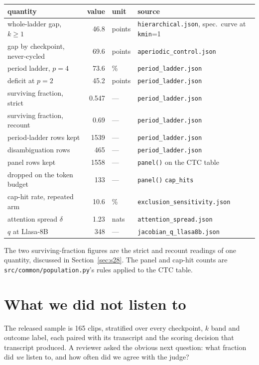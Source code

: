 \documentclass[11pt]{article}
\begin{document}
\begin{center}
{\footnotesize
\begin{tabular}{@{}lrll@{}}
\toprule
quantity & value & unit & source \\
\midrule
whole-ladder gap, $k\ge1$ & 46.8 & points & \texttt{hierarchical.json}, spec.\ curve at \texttt{kmin}=1 \\
gap by checkpoint, never-cycled & 69.6 & points & \texttt{aperiodic\_control.json} \\
period ladder, $p{=}4$ & 73.6 & \% & \texttt{period\_ladder.json} \\
deficit at $p{=}2$ & 45.2 & points & \texttt{period\_ladder.json} \\
surviving fraction, strict & 0.547 & --- & \texttt{period\_ladder.json} \\
surviving fraction, recount & 0.69 & --- & \texttt{period\_ladder.json} \\
period-ladder rows kept & 1539 & --- & \texttt{period\_ladder.json} \\
disambiguation rows & 465 & --- & \texttt{period\_ladder.json} \\
panel rows kept & 1558 & --- & \texttt{panel()} on the CTC table \\
dropped on the token budget & 133 & --- & \texttt{panel()} \texttt{cap\_hits} \\
cap-hit rate, repeated arm & 10.6 & \% & \texttt{exclusion\_sensitivity.json} \\
attention spread $\delta$ & 1.23 & nats & \texttt{attention\_spread.json} \\
$q$ at Llasa-8B & 348 & --- & \texttt{jacobian\_q\_llasa8b.json} \\
\bottomrule
\end{tabular}}
\end{center}

\noindent The two surviving-fraction figures are the strict and recount readings
of one quantity, discussed in Section~\ref{sec:s28}. The panel and cap-hit counts
are \texttt{src/common/population.py}'s rules applied to the CTC table.

\section{What we did not listen to}

The released sample is 165 clips, stratified over every checkpoint, $k$ band and
outcome label, each paired with its transcript and the scoring decision that
transcript produced. A reviewer asked the obvious next question: what fraction
did \emph{we} listen to, and how often did we agree with the judge?
\end{document}
